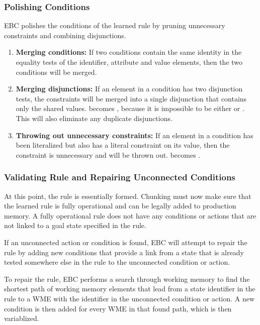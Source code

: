 \subsubsection{Polishing Conditions}

EBC polishes the conditions of the learned rule by pruning unnecessary constraints and combining disjunctions.

\begin{enumerate}
	\item \textbf{Merging conditions:}
	If two conditions contain the same identity in the equality tests of the identifier, attribute and value elements, then the two conditions will be merged.

	\item \textbf{Merging disjunctions:} 
	If an element in a condition has two disjunction tests, the constraints will be merged into a single disjunction that contains only the shared values.  becomes , because it is impossible  to be either  or .  This will also eliminate any duplicate disjunctions.

	\item \textbf{Throwing out unnecessary constraints:} 
	If an element in a condition has been literalized but also has a literal constraint on its value, then the constraint is unnecessary and will be thrown out.   becomes .
\end{enumerate}

\subsubsection{Validating Rule and Repairing Unconnected Conditions}
At this point, the rule is essentially formed.  Chunking must now make sure that the learned rule is fully operational and can be legally added to production memory.  A fully operational rule does not have any conditions or actions that are not linked to a goal state specified in the rule. 

If an unconnected action or condition is found, EBC will attempt to repair the rule by adding new conditions that provide a link from a state that is already tested somewhere else in the rule to the unconnected condition or action.

To repair the rule, EBC performs a search through working memory to find the shortest path of working memory elements that lead from a state identifier in the rule to a WME with the identifier in the unconnected condition or action.  A new condition is then added for every WME in that found path, which is then variablized.

